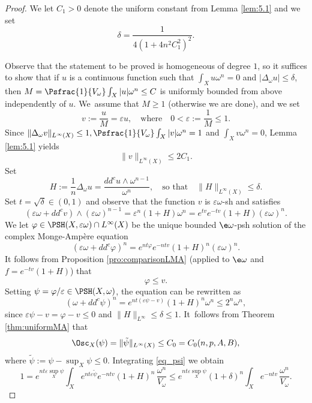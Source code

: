 \begin{proof}
We let $C_1>0$ denote the uniform constant from Lemma \ref{lem:5.1} and we set
\[
\delta=\frac{1}{4(1+4n^2C_1^2)^{2}}.
\]

Observe that the statement to be proved is homogeneous of degree $1$, so it suffices to show that
if $u$ is a continuous function such that $\int_X u \omega^n=0$ and $|\Delta_{\omega} u| \leq \delta$,
then $M=\Psfrac{1}{V_\omega}\int_ X |u|\omega^n \leq C$ is uniformly bounded from above independently of $u$. We~assume that $M \geq 1$ (otherwise we are done), and we set
\[
v:=\frac{u}{M} =\varepsilon u,
\quad \text{where} \quad
0<\varepsilon:= \frac{1}{M}\leq 1.
\]
Since $\|\Delta_\omega v\|_{L^\infty(X)} \leq 1, \Psfrac{1}{V_\omega} \int_X |v|\omega^n=1$
and $\int_X v\omega^n=0$, Lemma \ref{lem:5.1} yields
\begin{equation}\label{eq_bound_v}
\|v\|_{L^\infty(X)} \leq 2C_1.
\end{equation}
Set
\[
H:=\frac{1}{n}\Delta_\omega u= \frac{dd^c u\wedge \omega^{n-1}}{\omega^n},
\quad \text{so that} \quad
\|H\|_{L^\infty(X)}\leq \delta.
\]
Set $t=\sqrt{\delta} \in (0,1)$ and observe that the function $v$ is $\varepsilon\omega$-sh
and satisfies
\[
(\varepsilon\omega+dd^c v)\wedge (\varepsilon\omega)^{n-1}=\varepsilon^n(1+H)\omega^n= e^{tv }e^{-tv}(1+H) (\varepsilon \omega)^n .
\]
We let $\varphi\in\PSH(X, \varepsilon \omega)\cap L^{\infty}(X)$ be the unique bounded
$\e\omega$-psh solution of the complex Monge-Ampère equation
\[
(\varepsilon \omega +dd^c \varphi )^n= e^{nt\varphi }e^{-ntv}(1+H)^n (\varepsilon \omega)^n.
\]
It follows from Proposition \ref{pro:comparisonLMA}
(applied to $\e \omega$ and $f=e^{-tv}(1+H)$) that
\begin{equation}\label{eq_phi_v}
\varphi\leq v.
\end{equation}
Setting $ \psi=\varphi/ \varepsilon \in\PSH(X, \omega)$, the equation can be rewritten as
\begin{equation}\label{eq_psi}
( \omega +dd^c \psi )^n= e^{nt(\varepsilon\psi-v )}(1+H)^n \omega^n \leq 2^n \omega^n,
\end{equation}
since $\varepsilon\psi-v=\varphi-v \leq 0$ and $\|H\|_{L^\infty}\leq \delta \leq 1$. It~follows from Theorem \ref{thm:uniformMA} that
\[
\Osc_X (\psi)= \|\tilde{\psi}\|_{L^\infty(X)}\leq C_0=C_0(n,p,A,B),
\]
where $\tilde{\psi}:=\psi-\sup_X \psi \leq 0$.
Integrating \eqref{eq_psi} we obtain
\[
1= e^{nt\varepsilon \sup_X \psi} \int_X e^{nt\varepsilon\tilde{\psi}}e^{-ntv}(1+H)^n\,\frac{\omega^n}{V_\omega}
\leq e^{nt\varepsilon \sup_X \psi}(1+\delta)^n\int_X e^{-ntv}\,\frac{\omega^n}{V_\omega}.
\]
\end{proof}
